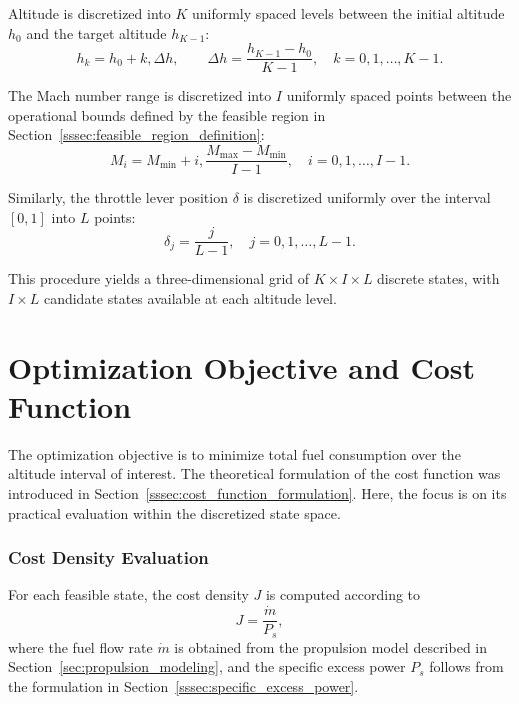 Altitude is discretized into $K$ uniformly spaced levels between the initial altitude $h_0$ and the target altitude $h_{K-1}$:
\begin{equation}
h_k = h_0 + k,\Delta h, \qquad \Delta h = \frac{h_{K-1}-h_0}{K-1}, \quad k = 0,1,\ldots,K-1.
\end{equation}

The Mach number range is discretized into $I$ uniformly spaced points between the operational bounds defined by the feasible region in Section~\ref{sssec:feasible_region_definition}:
\begin{equation}
M_i = M_{\min} + i,\frac{M_{\max}-M_{\min}}{I-1}, \quad i = 0,1,\ldots,I-1.
\end{equation}

Similarly, the throttle lever position $\delta$ is discretized uniformly over the interval $[0,1]$ into $L$ points:
\begin{equation}
\delta_j = \frac{j}{L-1}, \quad j = 0,1,\ldots,L-1.
\end{equation}

This procedure yields a three-dimensional grid of $K \times I \times L$ discrete states, with $I \times L$ candidate states available at each altitude level.

\section{Optimization Objective and Cost Function}

The optimization objective is to minimize total fuel consumption over the altitude interval of interest. The theoretical formulation of the cost function was introduced in Section~\ref{sssec:cost_function_formulation}. Here, the focus is on its practical evaluation within the discretized state space.

\subsubsection{Cost Density Evaluation}

For each feasible state, the cost density $J$ is computed according to
\begin{equation}
J = \frac{\dot{m}}{P_s},
\end{equation}
where the fuel flow rate $\dot{m}$ is obtained from the propulsion model described in Section~\ref{sec:propulsion_modeling}, and the specific excess power $P_s$ follows from the formulation in Section~\ref{sssec:specific_excess_power}.

